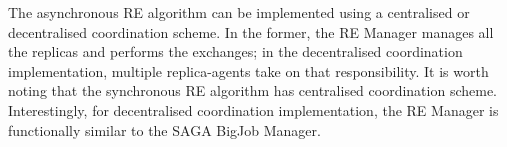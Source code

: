 \documentclass{rspublic}
\newcommand{\alnote}[1]{ {\textcolor{blue} { ***andre: #1 }}}
\newcommand{\alnote}[1]{}
\begin{document}

The asynchronous RE algorithm can be implemented using a centralised
or decentralised coordination scheme.  In the former, the RE Manager
manages all the replicas and performs the exchanges; in the
decentralised coordination implementation, multiple replica-agents
take on that responsibility.  It is worth noting that the synchronous
RE algorithm has centralised coordination scheme.  Interestingly, for
decentralised coordination implementation, the RE Manager is
functionally similar to the SAGA BigJob Manager.


\end{document}
